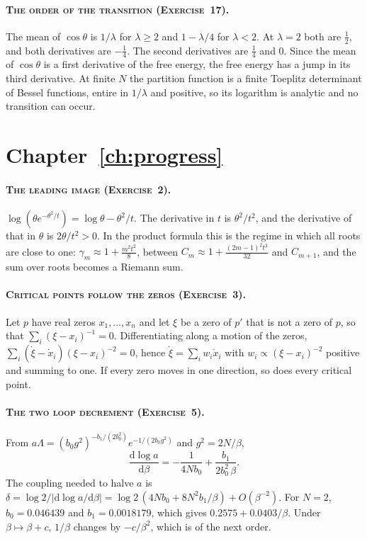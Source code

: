 \paragraph{\normalfont\scshape The order of the transition (Exercise~17).} The mean of $\cos\theta$ is $1/\lambda$ for $\lambda\ge2$ and $1-\lambda/4$ for $\lambda<2$. At $\lambda=2$ both are $\frac12$, and both derivatives are $-\frac14$. The second derivatives are $\frac14$ and $0$. Since the mean of $\cos\theta$ is a first derivative of the free energy, the free energy has a jump in its third derivative. At finite $N$ the partition function is a finite Toeplitz determinant of Bessel functions, entire in $1/\lambda$ and positive, so its logarithm is analytic and no transition can occur.

\section*{Chapter~\ref{ch:progress}}

\paragraph{\normalfont\scshape The leading image (Exercise~2).} $\log(\theta e^{-\theta^2/t})=\log\theta-\theta^2/t$. The derivative in $t$ is $\theta^2/t^2$, and the derivative of that in $\theta$ is $2\theta/t^2>0$. In the product formula this is the regime in which all roots are close to one: $\gamma_m\approx1+\frac{m^2t^2}{8}$, between $C_m\approx1+\frac{(2m-1)^2t^2}{32}$ and $C_{m+1}$, and the sum over roots becomes a Riemann sum.

\paragraph{\normalfont\scshape Critical points follow the zeros (Exercise~3).} Let $p$ have real zeros $x_1,\dots,x_n$ and let $\xi$ be a zero of $p'$ that is not a zero of $p$, so that $\sum_i(\xi-x_i)^{-1}=0$. Differentiating along a motion of the zeros, $\sum_i(\dot\xi-\dot x_i)(\xi-x_i)^{-2}=0$, hence $\dot\xi=\sum_iw_i\dot x_i$ with $w_i\propto(\xi-x_i)^{-2}$ positive and summing to one. If every zero moves in one direction, so does every critical point.

\paragraph{\normalfont\scshape The two loop decrement (Exercise~5).} From $a\Lambda=(b_0g^2)^{-b_1/(2b_0^2)}e^{-1/(2b_0g^2)}$ and $g^2=2N/\beta$,
\[
\frac{\mathrm d\log a}{\mathrm d\beta}=-\frac{1}{4Nb_0}+\frac{b_1}{2b_0^2\,\beta} .
\]
The coupling needed to halve $a$ is $\delta=\log2/|\mathrm d\log a/\mathrm d\beta|=\log2\,(4Nb_0+8N^2b_1/\beta)+O(\beta^{-2})$. For $N=2$, $b_0=0.046439$ and $b_1=0.0018179$, which gives $0.2575+0.0403/\beta$. Under $\beta\mapsto\beta+c$, $1/\beta$ changes by $-c/\beta^2$, which is of the next order.

